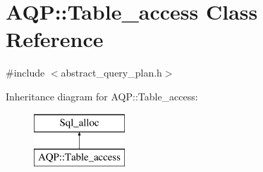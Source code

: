 \hypertarget{classAQP_1_1Table__access}{}\section{A\+QP\+:\+:Table\+\_\+access Class Reference}
\label{classAQP_1_1Table__access}


{\ttfamily \#include $<$abstract\+\_\+query\+\_\+plan.\+h$>$}

Inheritance diagram for A\+QP\+:\+:Table\+\_\+access\+:\begin{figure}[H]
\begin{center}
\leavevmode
\includegraphics[height=2.000000cm]{classAQP_1_1Table__access}
\end{center}
\end{figure}
